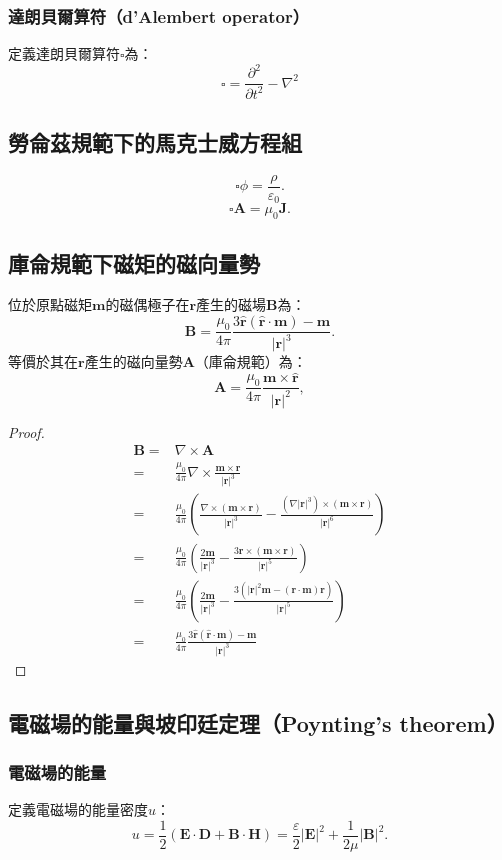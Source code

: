 \documentclass[a4paper,12pt]{report}
\begin{document}
\begin{itemize}
\subsubsection{達朗貝爾算符（d'Alembert operator）}
定義達朗貝爾算符$\square$為：
\[\square = \frac{\partial^2}{\partial t^2} - \nabla^2\]
\subsection{勞侖茲規範下的馬克士威方程組}
\[\square \phi = \frac{\rho}{\varepsilon_0}.\]
\[\square \mathbf{A} = \mu_0 \mathbf{J}.\]
\subsection{庫侖規範下磁矩的磁向量勢}
位於原點磁矩$\mathbf{m}$的磁偶極子在$\mathbf{r}$產生的磁場$\mathbf{B}$為：
\[\mathbf{B}=\frac{\mu_0}{4\pi}\frac{3\hat{\mathbf{r}}\left(\hat{\mathbf{r}}\cdot\mathbf{m}\right)-\mathbf{m}}{|\mathbf{r}|^3}.\]
等價於其在$\mathbf{r}$產生的磁向量勢$\mathbf{A}$（庫侖規範）為：
\[\mathbf{A} = \frac{\mu_0}{4\pi} \frac{\mathbf{m} \times \hat{\mathbf{r}}}{|\mathbf{r}|^2},\]
\begin{proof}
\[\begin{aligned}
\mathbf{B}=&\nabla\times\mathbf{A}\\
=&\frac{\mu_0}{4\pi}\nabla\times\frac{\mathbf{m}\times\mathbf{r}}{|\mathbf{r}|^3}\\
=&\frac{\mu_0}{4\pi}\left(\frac{\nabla\times(\mathbf{m}\times\mathbf{r})}{|\mathbf{r}|^3}-\frac{(\nabla|\mathbf{r}|^3)\times(\mathbf{m}\times\mathbf{r})}{|\mathbf{r}|^6}\right)\\
=&\frac{\mu_0}{4\pi}\left(\frac{2\mathbf{m}}{|\mathbf{r}|^3}-\frac{3\mathbf{r}\times(\mathbf{m}\times\mathbf{r})}{|\mathbf{r}|^5}\right)\\
=&\frac{\mu_0}{4\pi}\left(\frac{2\mathbf{m}}{|\mathbf{r}|^3}-\frac{3\left(|\mathbf{r}|^2\mathbf{m}-(\mathbf{r}\cdot\mathbf{m})\mathbf{r}\right)}{|\mathbf{r}|^5}\right)\\
=&\frac{\mu_0}{4\pi}\frac{3\hat{\mathbf{r}}\left(\hat{\mathbf{r}}\cdot\mathbf{m}\right)-\mathbf{m}}{|\mathbf{r}|^3}
\end{aligned}\]
\end{proof}
\subsection{電磁場的能量與坡印廷定理（Poynting's theorem）}
\subsubsection{電磁場的能量}
定義電磁場的能量密度$u$：
\[u=\frac{1}{2}(\mathbf{E}\cdot\mathbf{D}+\mathbf{B}\cdot\mathbf{H})=\frac{\varepsilon}{2}|\mathbf{E}|^2+\frac{1}{2\mu}|\mathbf{B}|^2.\]

\end{itemize}
\end{document}
